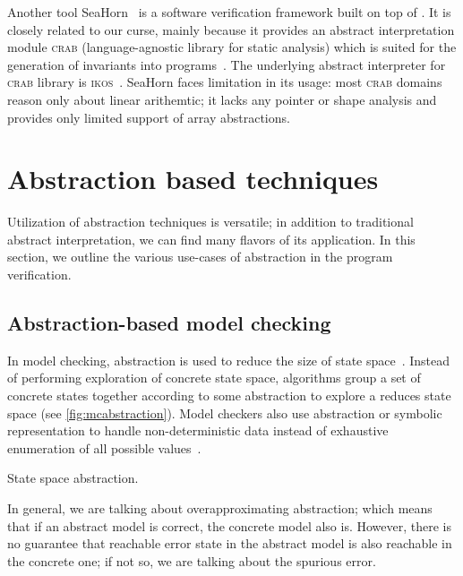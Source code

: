 Another tool SeaHorn~\cite{Gurfinkel2015} is a software verification framework
built on top of \llvm.  It is closely related to our curse, mainly because it
provides an abstract interpretation module \textsc{crab} (language-agnostic
library for static analysis) which is suited for the generation of invariants
into \llvm programs~\cite{Gershuni2019}. The underlying abstract interpreter
for \textsc{crab} library is \textsc{ikos}~\cite{Ikos}. SeaHorn faces
limitation in its usage: most \textsc{crab} domains reason only about linear
arithemtic; it lacks any pointer or shape analysis and provides only limited
support of array abstractions.

\section{Abstraction based techniques}
\label{sec:techniques}

Utilization of abstraction techniques is versatile; in addition to traditional
abstract interpretation, we can find many flavors of its application. In this
section, we outline the various use-cases of abstraction in the program
verification.

\subsection{Abstraction-based model checking}

In model checking, abstraction is used to reduce the size of state space~\cite{Pelnek2006}.
Instead of performing exploration of concrete state space, algorithms group a
set of concrete states together according to some abstraction to explore a
reduces state space (see \autoref{fig:mcabstraction}). Model checkers also use
abstraction or symbolic representation to handle non-deterministic data instead
of exhaustive enumeration of all possible values~\cite{Mrazek2016}.

\begin{marginfigure}


\caption{State space abstraction.}
\label{fig:mcabstraction}
\end{marginfigure}

In general, we are talking about overapproximating abstraction; which means
that if an abstract model is correct, the concrete model also is. However,
there is no guarantee that reachable error state in the abstract model is also
reachable in the concrete one; if not so, we are talking about the spurious error.

